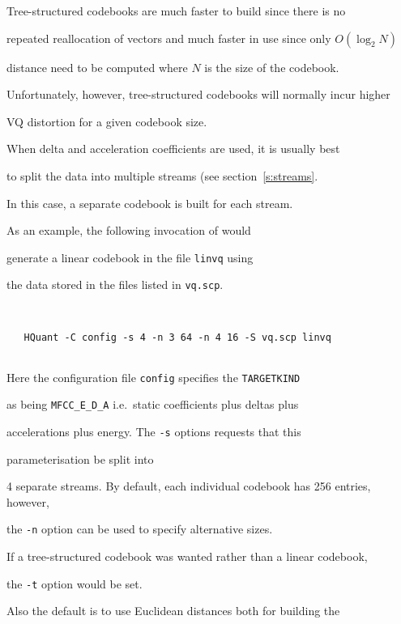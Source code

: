 Tree-structured codebooks are much faster to build since there is no


repeated reallocation of vectors and much faster in use since only $O(\log_2 N)$


distance need to be computed where $N$ is the size of the codebook.


Unfortunately, however, tree-structured codebooks will normally incur higher 


VQ distortion for a given codebook size.





When delta and acceleration coefficients are used, it is usually best


to split the data into multiple streams (see section~\ref{s:streams}.


In this case, a separate codebook is built for each stream.





As an example, the following invocation of  would


generate a linear codebook in the file \texttt{linvq} using


the data stored in the files listed in \texttt{vq.scp}.  


\begin{verbatim}


   HQuant -C config -s 4 -n 3 64 -n 4 16 -S vq.scp linvq


\end{verbatim}


Here the configuration file \texttt{config} specifies the \texttt{TARGETKIND}


as being \texttt{MFCC\_E\_D\_A} i.e.\ static coefficients plus deltas plus


accelerations plus energy.  The \texttt{-s} options requests that this


parameterisation be split into


4 separate streams.  By default, each individual codebook has 256 entries, however,


the \texttt{-n} option can be used to specify alternative sizes.





If a tree-structured codebook was wanted rather than a linear codebook,


the \texttt{-t} option would be set.


Also the default is to use Euclidean distances both for building the


